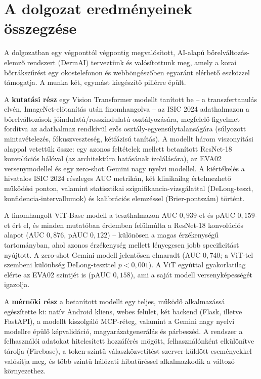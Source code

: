 
\section{A dolgozat eredményeinek összegzése}

A dolgozatban egy végponttól végpontig megvalósított, AI-alapú
bőrelváltozás-elemző rendszert (DermAI) terveztünk és valósítottunk meg, amely a
korai bőrrákszűrést egy okostelefonon és webböngészőben egyaránt elérhető
eszközzel támogatja. A munka két, egymást kiegészítő pillérre épült.

A \textbf{kutatási rész} egy Vision Transformer modellt tanított be -- a
transzfertanulás elvén, ImageNet-előtanítás után finomhangolva -- az ISIC 2024
adathalmazon a bőrelváltozások jó\-indulatú/rosszindulatú osztályozására,
megfelelő figyelmet fordítva az adathalmaz rendkívül erős
osztály-egyensúlytalanságára (súlyozott mintavételezés, fókuszveszteség,
kétfázisú tanítás). A modellt három viszonyítási alappal vetettük össze: egy azonos
feltételek mellett betanított ResNet-18 konvolúciós hálóval (az architektúra
hatásának izolálására), az EVA02 versenymodellel és egy
zero-shot Gemini nagy nyelvi modellel. A kiértékelés a hivatalos ISIC 2024
részleges AUC metrikán, két klinikailag értelmezhető működési ponton, valamint
statisztikai szignifikancia-vizsgálattal (DeLong-teszt, konfidencia-intervallumok)
és kalibrációs elemzéssel (Brier-pontszám) történt.

A finomhangolt ViT-Base modell a teszthalmazon AUC $0{,}939$-et és pAUC
$0{,}159$-et ért el, és minden mutatóban érdemben felülmúlta a ResNet-18
konvolúciós alapot (AUC $0{,}876$, pAUC $0{,}122$) -- különösen a magas
érzékenységű tartományban, ahol azonos érzékenység mellett lényegesen jobb
specificitást nyújtott. A zero-shot Gemini modell jelentősen elmaradt (AUC
$0{,}740$; a ViT-tel szembeni különbség DeLong-teszttel $p < 0{,}001$). A ViT
egyúttal gyakorlatilag elérte az EVA02
szintjét is (pAUC $0{,}158$), ami a saját modell versenyképességét igazolja.

A \textbf{mérnöki rész} a betanított modellt egy teljes, működő alkalmazássá
egészítette ki: natív Android kliens, webes felület, két backend (Flask, illetve
FastAPI), a modellt kiszolgáló MCP-réteg, valamint a Gemini nagy nyelvi modellre
épülő képvalidáció, magyarázatgenerálás és párbeszéd. A rendszer a felhasználói
adatokat hitelesített hozzáférés mögött, felhasználónként elkülönítve tárolja
(Firebase), a token-szintű válaszközvetítést szerver-küldött eseményekkel valósítja
meg, és több szintű hálózati hibatűréssel alkalmazkodik a változó környezethez.

